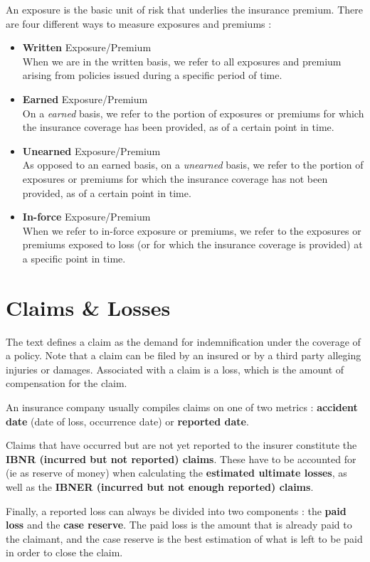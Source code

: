 \documentclass[11pt, english]{memoir}
\numberwithin{definition}{section}
\begin{document}
An exposure is the basic unit of risk that underlies the insurance premium. There are four different ways to measure exposures and premiums : 
\begin{itemize}
\item \textbf{Written} Exposure/Premium \\
When we are in the written basis, we refer to all exposures and premium arising from policies issued during a specific period of time.
\item \textbf{Earned}  Exposure/Premium \\
On a \emph{earned} basis, we refer to the portion of exposures or premiums for which the insurance coverage has been provided, as of a certain point in time. 
\item \textbf{Unearned}  Exposure/Premium \\
As opposed to an earned basis, on a \emph{unearned} basis, we refer to the portion of exposures or premiums for which the insurance coverage has not been provided, as of a certain point in time. 
\item \textbf{In-force}  Exposure/Premium \\
When we refer to in-force exposure or premiums, we refer to the exposures or premiums exposed to loss (or for which the insurance coverage is provided) at a specific point in time.   
\end{itemize}

\section{Claims \& Losses}
The text defines a claim as the demand for indemnification under the coverage of a policy. Note that a claim can be filed by an insured or by a third party alleging injuries or damages. Associated with a claim is a loss,  which is the amount of compensation for the claim. 

An insurance company usually compiles claims on one of two metrics : \textbf{accident date} (date of loss, occurrence date) or \textbf{reported date}. 

Claims that have occurred but are not yet reported to the insurer constitute the \textbf{IBNR (incurred but not reported) claims}. These have to be accounted for (ie as reserve of money) when calculating the \textbf{estimated ultimate losses}, as well as the \textbf{IBNER (incurred but not enough reported) claims}. 

Finally, a reported loss can always be divided into two components : the \textbf{paid loss} and the \textbf{case reserve}. The paid loss is the amount that is already paid to the claimant, and the case reserve is the best estimation of what is left to be paid in order to close the claim. 
\end{document}
